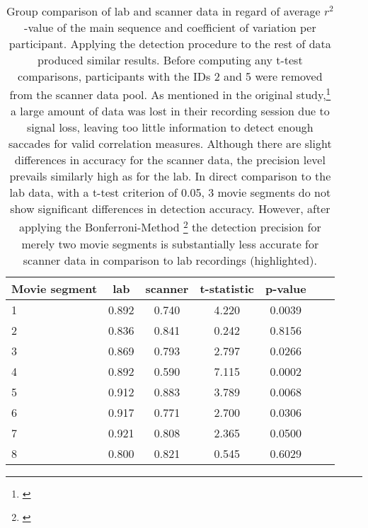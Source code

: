 \documentclass[10pt,a4paper]{extarticle}
\begin{document}
\begin{table}[h]

\centering
\begin{tabular}{lcccccc}
\toprule
Movie segment & lab  & scanner & t-statistic & p-value \\
\midrule
\rowcolor{lightgray}
1 	&	0.892 	&	0.740	& 	4.220	& 	0.0039	\\

2	&   0.836 	&   0.841 	& 	0.242	& 	0.8156	\\

3 	&   0.869 	& 	0.793	& 	2.797 	& 	0.0266	\\
\rowcolor{lightgray}
4 	&   0.892 	& 	0.590 	& 	7.115 	& 	0.0002	\\

5 	&   0.912 	& 	0.883 	& 	3.789 	& 	0.0068	\\

6 	&   0.917 	& 	0.771 	& 	2.700	& 	0.0306	\\

7 	&   0.921 	& 	0.808 	& 	2.365 	& 	0.0500	\\

8 	&   0.800 	& 	0.821 	& 	0.545	& 	0.6029	\\
\bottomrule



\end{tabular}
\caption[]{Group comparison of lab and scanner data in regard of average $r^2$-value of the main sequence and coefficient of variation per participant. Applying the detection procedure to the rest of data produced similar results. Before computing any t-test comparisons, participants with the IDs 2 and 5 were removed from the scanner data pool. As mentioned in the original study,\footnote{\cite{Hanke.2016}} a large amount of data was lost in their recording session due to signal loss, leaving too little information to detect enough saccades for valid correlation measures. Although there are slight differences in accuracy for the scanner data, the precision level prevails similarly high as for the lab. In direct comparison to the lab data, with a t-test criterion of 0.05, 3 movie segments do not show significant differences in detection accuracy. However, after applying the Bonferroni-Method \footnote{\cite{Abdi.2007}} the detection precision for merely two movie segments is substantially less accurate for scanner data in comparison to lab recordings (highlighted).}
\label{groupcompare}
\end{table}
\twocolumn
\end{document}
